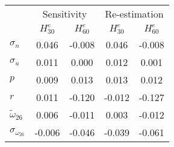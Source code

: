 \begin{tabular}{l*{4}{c}} \toprule 
& \multicolumn{2}{c}{Sensitivity} & \multicolumn{2}{c}{Re-estimation} \\ \cmidrule(lr){2-3} \cmidrule(lr){4-5} 
& $H^e_{30}$ & $H^e_{60}$ & $H^e_{30}$ & $H^e_{60}$ \\ \cmidrule(lr){2-5} 
  $\sigma_{n}$ & 0.046 & -0.008 & 0.046 & -0.008 \\ 
  $\sigma_{u}$ & 0.011 & 0.000 & 0.012 & 0.001 \\ 
  $p$ & 0.009 & 0.013 & 0.013 & 0.012 \\ 
  $r$ & 0.011 & -0.120 & -0.012 & -0.127 \\ 
  $\tilde{\omega}_{26}$ & 0.006 & -0.011 & 0.003 & -0.012 \\ 
  $\sigma_{\omega_{26}}$ & -0.006 & -0.046 & -0.039 & -0.061 \\ 
 \bottomrule 
 \end{tabular}